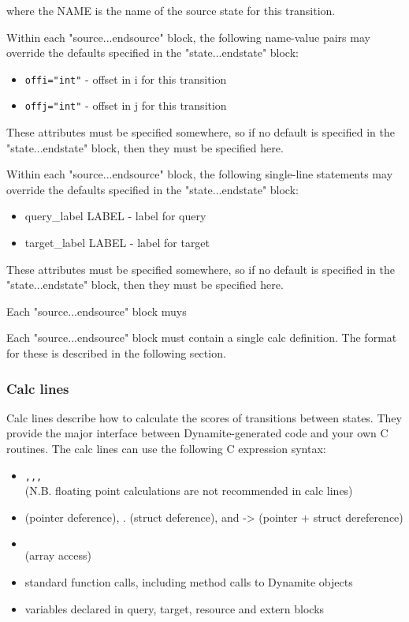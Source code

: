 where the NAME is the name of the source state for this transition.

Within each "source...endsource" block, the following name-value pairs
may override the defaults specified in the "state...endstate" block:

\begin{itemize}
\item {\tt offi="int"} - offset in i for this transition
\item {\tt offj="int"} - offset in j for this transition
\end{itemize}


These attributes must be specified somewhere, so if no default is specified
in the "state...endstate" block, then they must be specified here.

Within each "source...endsource" block, the following single-line statements
may override the defaults specified in the "state...endstate" block:

\begin{itemize}
\item query\_label LABEL - label for query 
\item target\_label LABEL - label for target
\end{itemize}

These attributes must be specified somewhere, so if no default is specified
in the "state...endstate" block, then they must be specified here.

Each "source...endsource" block muys

Each "source...endsource" block must contain a single calc definition.
The format for these is described in the following section.

\subsubsection{Calc lines}
Calc lines describe how to calculate the scores of transitions between states.
They provide the major interface between Dynamite-generated code and your own
C routines. The calc lines can use the following C expression syntax:

\begin{itemize}
\item {\tt \+,\-,\*,\\} (N.B. floating point calculations are not recommended in calc lines)
\item {\tt \*} (pointer deference), . (struct deference), and -> (pointer + struct dereference)
\item {\tt \[\]} (array access)
\item standard function calls, including method calls to Dynamite objects
\item variables declared in query, target, resource and extern blocks
\end{itemize}

